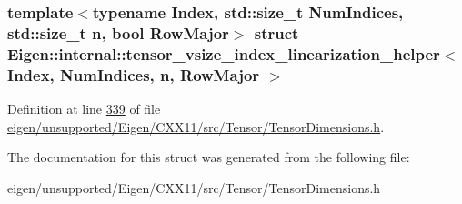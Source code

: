 \subsubsection*{template$<$typename Index, std\+::size\+\_\+t Num\+Indices, std\+::size\+\_\+t n, bool Row\+Major$>$\newline
struct Eigen\+::internal\+::tensor\+\_\+vsize\+\_\+index\+\_\+linearization\+\_\+helper$<$ Index, Num\+Indices, n, Row\+Major $>$}



Definition at line \hyperlink{eigen_2unsupported_2_eigen_2_c_x_x11_2src_2_tensor_2_tensor_dimensions_8h_source_l00339}{339} of file \hyperlink{eigen_2unsupported_2_eigen_2_c_x_x11_2src_2_tensor_2_tensor_dimensions_8h_source}{eigen/unsupported/\+Eigen/\+C\+X\+X11/src/\+Tensor/\+Tensor\+Dimensions.\+h}.



The documentation for this struct was generated from the following file\+:\begin{DoxyCompactItemize}
\item 
eigen/unsupported/\+Eigen/\+C\+X\+X11/src/\+Tensor/\+Tensor\+Dimensions.\+h\end{DoxyCompactItemize}
